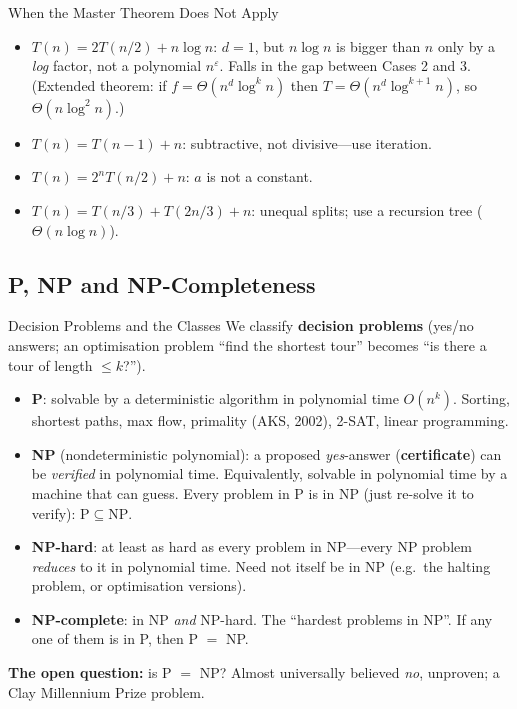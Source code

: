 \documentclass[11pt,a4paper]{article}
\begin{document}
\begin{pitfall}{When the Master Theorem Does Not Apply}
\begin{itemize}
    \item $T(n) = 2T(n/2) + n\log n$: $d = 1$, but $n \log n$ is bigger than $n$ only by a \emph{log} factor, not a polynomial $n^\varepsilon$. Falls in the gap between Cases 2 and 3. (Extended theorem: if $f = \Theta(n^d\log^k n)$ then $T = \Theta(n^d\log^{k+1} n)$, so $\Theta(n\log^2 n)$.)
    \item $T(n) = T(n-1) + n$: subtractive, not divisive---use iteration.
    \item $T(n) = 2^nT(n/2) + n$: $a$ is not a constant.
    \item $T(n) = T(n/3) + T(2n/3) + n$: unequal splits; use a recursion tree ($\Theta(n\log n)$).
\end{itemize}
\end{pitfall}

\subsection{P, NP and NP-Completeness}

\begin{keyconcept}{Decision Problems and the Classes}
We classify \textbf{decision problems} (yes/no answers; an optimisation problem ``find the shortest tour'' becomes ``is there a tour of length $\le k$?'').
\begin{itemize}
    \item \textbf{P}: solvable by a deterministic algorithm in polynomial time $O(n^k)$. Sorting, shortest paths, max flow, primality (AKS, 2002), 2-SAT, linear programming.
    \item \textbf{NP} (nondeterministic polynomial): a proposed \emph{yes}-answer (\textbf{certificate}) can be \emph{verified} in polynomial time. Equivalently, solvable in polynomial time by a machine that can guess. Every problem in P is in NP (just re-solve it to verify): $\mathrm{P} \subseteq \mathrm{NP}$.
    \item \textbf{NP-hard}: at least as hard as every problem in NP---every NP problem \emph{reduces} to it in polynomial time. Need not itself be in NP (e.g.\ the halting problem, or optimisation versions).
    \item \textbf{NP-complete}: in NP \emph{and} NP-hard. The ``hardest problems in NP''. If any one of them is in P, then P $=$ NP.
\end{itemize}
\textbf{The open question:} is P $=$ NP? Almost universally believed \emph{no}, unproven; a Clay Millennium Prize problem.
\end{keyconcept}
\end{document}
